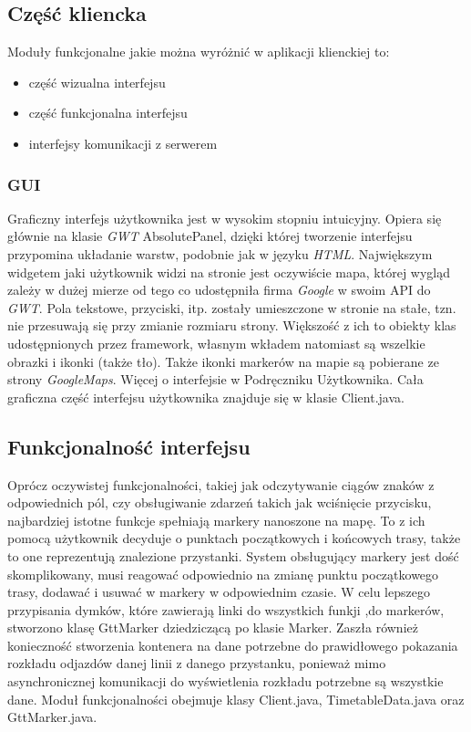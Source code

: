 \documentclass[a4paper,12pt]{article}
\begin{document}
\subsection{Część kliencka}
 Moduły funkcjonalne jakie można wyróżnić w aplikacji klienckiej to:
\begin{itemize}
\item część wizualna interfejsu
\item część funkcjonalna interfejsu
\item interfejsy komunikacji z serwerem
\end{itemize}

\subsubsection{GUI}
Graficzny interfejs użytkownika jest w wysokim stopniu intuicyjny. Opiera się
głównie na klasie \emph{GWT} AbsolutePanel, dzięki której tworzenie interfejsu przypomina
układanie warstw, podobnie jak w języku \emph{HTML}. Największym widgetem jaki użytkownik
widzi na stronie jest oczywiście mapa, której wygląd zależy w dużej mierze od tego
co udostępniła firma \emph{Google} w swoim API do \emph{GWT}. Pola tekstowe, przyciski, itp.
zostały umieszczone w stronie na stałe, tzn. nie przesuwają się przy zmianie
rozmiaru strony. Większość z ich to obiekty klas udostępnionych przez framework,
własnym wkładem natomiast są wszelkie obrazki i ikonki (także tło). Także ikonki
markerów na mapie są pobierane ze strony \emph{GoogleMaps}. Więcej o interfejsie
w Podręczniku Użytkownika. Cała graficzna część interfejsu użytkownika znajduje się
w klasie Client.java.

\subsection{Funkcjonalność interfejsu}
Oprócz oczywistej funkcjonalności, takiej jak odczytywanie ciągów znaków z
odpowiednich pól, czy obsługiwanie zdarzeń takich jak wciśnięcie przycisku,
najbardziej istotne funkcje spełniają markery nanoszone na mapę. To z ich
pomocą użytkownik decyduje o punktach początkowych i końcowych trasy, także
to one reprezentują znalezione przystanki. System obsługujący markery jest
dość skomplikowany, musi reagować odpowiednio na zmianę punktu początkowego
trasy, dodawać i usuwać w markery w odpowiednim czasie. W celu lepszego
przypisania dymków, które zawierają linki do wszystkich funkji ,do markerów,
stworzono klasę GttMarker dziedziczącą po klasie Marker. Zaszła również
konieczność stworzenia kontenera na dane potrzebne do prawidłowego pokazania
rozkładu odjazdów danej linii z danego przystanku, ponieważ mimo asynchronicznej
komunikacji do wyświetlenia rozkładu potrzebne są wszystkie dane. Moduł
funkcjonalności obejmuje klasy Client.java, TimetableData.java oraz GttMarker.java.
\end{document}
